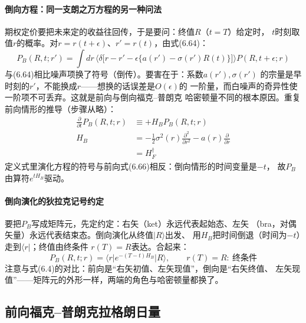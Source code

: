 \paragraph{倒向方程：同一支朗之万方程的另一种问法}
期权定价要把未来定的收益往回传，于是要问：终值$R$（$t=T$）给定时，
$t$时刻取值$r$的概率。对$r=r(t+\epsilon)$、$r'=r(t)$，由式(6.64)：
\begin{equation*}
P_B(R,t;r')=\int dr\,\bigl\langle
\delta\bigl[r-r'-\epsilon\{a(r')-\sigma(r')R(t)\}\bigr]\bigr\rangle
P(R,t+\epsilon;r)
\tag{6.69}
\end{equation*}
与(6.64)相比噪声项换了符号（倒传）。要害在于：系数$a(r'),\sigma(r')$
的宗量是早时刻的$r'$，不能换成$r$——想换的话误差是$O(\epsilon)$的
一阶量，而白噪声的奇异性使一阶项不可丢弃。这就是前向与倒向福克--普朗克
哈密顿量不同的根本原因。重复前向情形的推导（步骤从略）：
\begin{align*}
\frac{\partial}{\partial t}P_B(R,t;r)&\equiv+H_BP_B(R,t;r)\\
H_B&=-\frac{1}{2}\sigma^2(r)\frac{\partial^2}{\partial r^2}
-a(r)\frac{\partial}{\partial r}\\
&=H_F^{\dagger}
\tag{6.70}
\end{align*}
定义式里演化方程的符号与前向式(6.66)相反：倒向情形的时间变量是$-t$，
故$P_B$由算符$e^{tH_B}$驱动。

\paragraph{倒向演化的狄拉克记号约定}
要把$P_B$写成矩阵元，先定约定：右矢（ket）永远代表起始态、左矢
（bra，对偶矢量）永远代表结束态。倒向演化从终值$\vert R\rangle$出发、
用$H_B$把时间倒退（时间为$-t$）走到$\langle r\vert$；终值由终条件
$r(T)=R$表达。合起来：
\begin{equation*}
P_B(R,t;r)=\langle r\vert e^{-(T-t)H_B}\vert R\rangle,\qquad
r(T)=R:\ \text{终条件}
\tag{6.71}
\end{equation*}
注意与式(6.4)的对比：前向是“右矢初值、左矢现值”，倒向是“右矢终值、
左矢现值”——矩阵元的外形一样，两端的角色与哈密顿量都换了。

\subsection*{前向福克--普朗克拉格朗日量}

